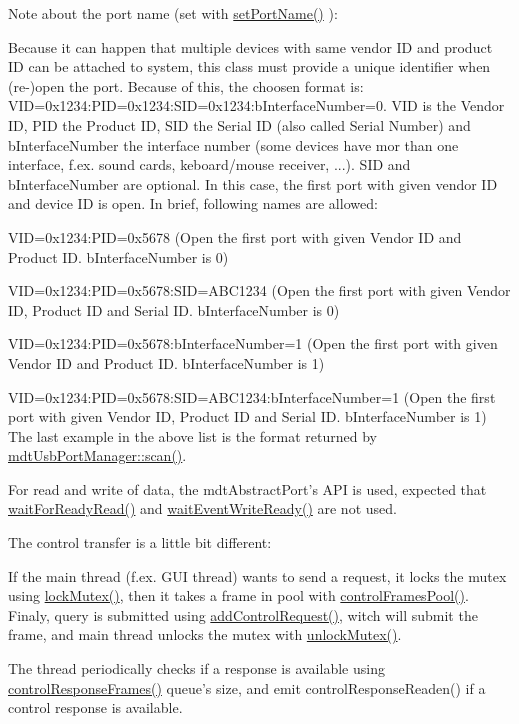 Note about the port name (set with \hyperlink{classmdt_abstract_port_a0ca143d32fc677bac7c1cf0e04144932}{setPortName()} ):\par
 Because it can happen that multiple devices with same vendor ID and product ID can be attached to system, this class must provide a unique identifier when (re-\/)open the port. Because of this, the choosen format is: VID=0x1234:PID=0x1234:SID=0x1234:bInterfaceNumber=0. VID is the Vendor ID, PID the Product ID, SID the Serial ID (also called Serial Number) and bInterfaceNumber the interface number (some devices have mor than one interface, f.ex. sound cards, keboard/mouse receiver, ...). SID and bInterfaceNumber are optional. In this case, the first port with given vendor ID and device ID is open. In brief, following names are allowed:
\begin{DoxyItemize}
\item VID=0x1234:PID=0x5678 (Open the first port with given Vendor ID and Product ID. bInterfaceNumber is 0)
\item VID=0x1234:PID=0x5678:SID=ABC1234 (Open the first port with given Vendor ID, Product ID and Serial ID. bInterfaceNumber is 0)
\item VID=0x1234:PID=0x5678:bInterfaceNumber=1 (Open the first port with given Vendor ID and Product ID. bInterfaceNumber is 1)
\item VID=0x1234:PID=0x5678:SID=ABC1234:bInterfaceNumber=1 (Open the first port with given Vendor ID, Product ID and Serial ID. bInterfaceNumber is 1) The last example in the above list is the format returned by \hyperlink{classmdt_usb_port_manager_a3a2370c3a2d0353a880bf9b777728c3b}{mdtUsbPortManager::scan()}.
\end{DoxyItemize}

For read and write of data, the mdtAbstractPort's API is used, expected that \hyperlink{classmdt_usb_port_ab8ddd4ebee603ac381e8da0383a61e36}{waitForReadyRead()} and \hyperlink{classmdt_usb_port_a3be875f6f10ae94fd3a94f925bb935e7}{waitEventWriteReady()} are not used.

The control transfer is a little bit different:
\begin{DoxyItemize}
\item If the main thread (f.ex. GUI thread) wants to send a request, it locks the mutex using \hyperlink{classmdt_abstract_port_a6bf2ecdcf894da3929a22eb8793a9fe3}{lockMutex()}, then it takes a frame in pool with \hyperlink{classmdt_usb_port_af146b08006ddbe18fb537ae1a75b622e}{controlFramesPool()}. Finaly, query is submitted using \hyperlink{classmdt_usb_port_a4fbcd0fcc179335c55c6d7ccc40a7c31}{addControlRequest()}, witch will submit the frame, and main thread unlocks the mutex with \hyperlink{classmdt_abstract_port_a3523c72a06e4d950338f91e56c286e84}{unlockMutex()}.
\item The thread periodically checks if a response is available using \hyperlink{classmdt_usb_port_a304825c7d9173a3dcb5e26a412f1038b}{controlResponseFrames()} queue's size, and emit controlResponseReaden() if a control response is available.
\end{DoxyItemize}

